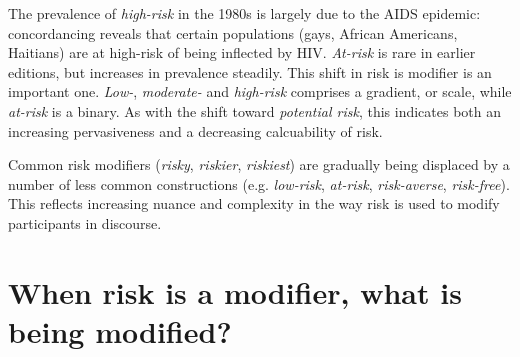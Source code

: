     The prevalence of \emph{high-risk} in the 1980s is largely due to the AIDS epidemic: concordancing reveals that certain populations (gays, African Americans, Haitians) are at high-risk of being inflected by HIV. \emph{At-risk} is rare in earlier editions, but increases in prevalence steadily. This shift in risk is modifier is an important one. \emph{Low-}, \emph{moderate-} and \emph{high-risk} comprises a gradient, or scale, while \emph{at-risk} is a binary. As with the shift toward \emph{potential risk}, this indicates both an increasing pervasiveness and a decreasing calcuability of risk. %
    




    \vspace{5mm}\noindent\begin{tcolorbox}[colback=yellow!5,colframe=yellow!40!black,title=Summary: frequencies of modifier risk]
    \parbox{1\textwidth}{%
    Common risk modifiers (\emph{risky}, \emph{riskier}, \emph{riskiest}) are gradually being displaced by a number of less common constructions (e.g. \emph{low-risk}, \emph{at-risk}, \emph{risk-averse}, \emph{risk-free}). This reflects increasing nuance and complexity in the way risk is used to modify participants in discourse.}
    \end{tcolorbox}
    \vspace{5mm}

\section{When risk is a modifier, what is being modified?} \label{sect:mod_two} \FloatBarrier 

